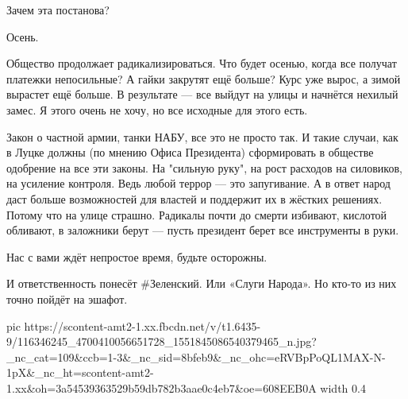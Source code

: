 Зачем эта постанова?

Осень.

Общество продолжает радикализироваться. Что будет осенью, когда все получат
платежки непосильные? А гайки закрутят ещё больше? Курс уже вырос, а зимой
вырастет ещё больше. В результате — все выйдут на улицы и начнётся нехилый
замес. Я этого очень не хочу, но все исходные для этого есть.

Закон о частной армии, танки НАБУ, все это не просто так. И такие случаи, как в
Луцке должны (по мнению Офиса Президента) сформировать в обществе одобрение на
все эти законы. На "сильную руку", на рост расходов на силовиков, на усиление
контроля. Ведь любой террор — это запугивание. А в ответ народ даст больше
возможностей для властей и поддержит их в жёстких решениях. Потому что на улице
страшно. Радикалы почти до смерти избивают, кислотой обливают, в заложники
берут — пусть президент берет все инструменты в руки.

Нас с вами ждёт непростое время, будьте осторожны.

И ответственность понесёт #Зеленский. Или «Слуги Народа». Но кто-то из них
точно пойдёт на эшафот.


\ifcmt
  pic https://scontent-amt2-1.xx.fbcdn.net/v/t1.6435-9/116346245_4700410056651728_1551845086540379465_n.jpg?_nc_cat=109&ccb=1-3&_nc_sid=8bfeb9&_nc_ohc=eRVBpPoQL1MAX-N-1pX&_nc_ht=scontent-amt2-1.xx&oh=3a54539363529b59db782b3aae0c4eb7&oe=608EEB0A
  width 0.4
\fi

